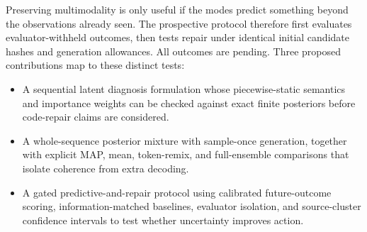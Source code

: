 Preserving multimodality is only useful if the modes predict something beyond the observations already seen. The prospective protocol therefore first evaluates evaluator-withheld outcomes, then tests repair under identical initial candidate hashes and generation allowances. All outcomes are pending. Three proposed contributions map to these distinct tests:
\begin{itemize}
\item A sequential latent diagnosis formulation whose piecewise-static semantics and importance weights can be checked against exact finite posteriors before code-repair claims are considered.
\item A whole-sequence posterior mixture with sample-once generation, together with explicit MAP, mean, token-remix, and full-ensemble comparisons that isolate coherence from extra decoding.
\item A gated predictive-and-repair protocol using calibrated future-outcome scoring, information-matched baselines, evaluator isolation, and source-cluster confidence intervals to test whether uncertainty improves action.
\end{itemize}
